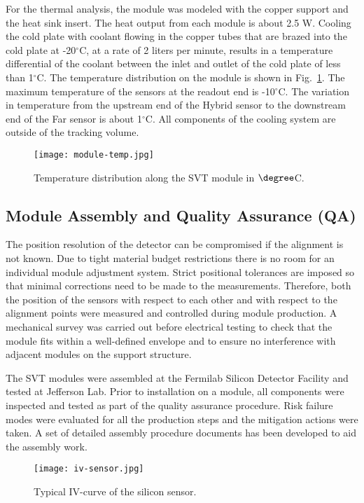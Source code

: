 For the thermal analysis, the module was modeled with the copper support and the heat sink insert. The heat output from each module is about 2.5 W. Cooling the cold plate with coolant flowing in the copper tubes that are brazed into the cold plate at -20$^\circ$C, at a rate of 2 liters per minute, results in a temperature differential of the coolant between the inlet and outlet of the cold plate of less than 1$^\circ$C. The temperature distribution on the module is shown in Fig.~\ref{fig:module-temp}. The maximum temperature of the sensors at the readout end is -10$^\circ$C. The variation in temperature from the upstream end of the Hybrid sensor to the downstream end of the Far sensor is about 1$^\circ$C. All components of the cooling system are outside of the tracking volume.

\begin{figure}[h] 
\centering 
\texttt{[image: module-temp.jpg]}
\caption{Temperature distribution along the SVT module in $\degree$C.}
\label{fig:module-temp}
\end{figure}

\subsection{Module Assembly and Quality Assurance (QA)}

The position resolution of the detector can be compromised if the alignment is not known. Due to tight material budget restrictions there is no room for an individual module adjustment system. Strict positional tolerances are imposed so that minimal corrections need to be made to the measurements. Therefore, both the position of the sensors with respect to each other and with respect to the alignment points were measured and controlled during module production. A mechanical survey was  carried out before electrical testing to check that the module fits within a well-defined envelope and to ensure no interference with adjacent modules on the support structure. 

The SVT modules were assembled at the Fermilab Silicon Detector Facility and tested at Jefferson Lab. Prior to installation on a module, all components were inspected and tested as part of the quality assurance procedure. Risk failure modes were evaluated for all the production steps and the mitigation actions were taken. A set of detailed assembly procedure documents has been developed to aid the assembly work.

\begin{figure}[h] 
\centering 
\texttt{[image: iv-sensor.jpg]}
\caption{Typical IV-curve of the silicon sensor.}
\label{fig:iv-sensor}
\end{figure}

